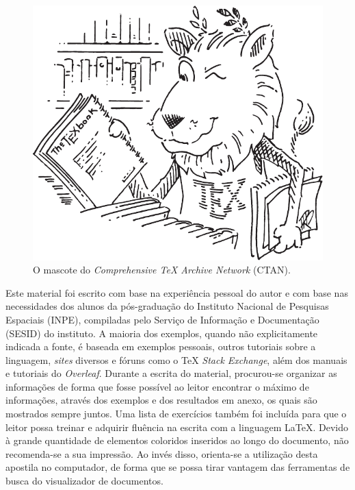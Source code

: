\begin{figure}[H]
\caption{O mascote do \textit{Comprehensive \TeX{} Archive Network} (CTAN).}
\vspace{6mm}
    \begin{center}
        \includegraphics[scale=0.8]{./docs/figs/ctanlion.pdf}
    \end{center}
\vspace{4mm}
\label{fig:leao_ctan}
\end{figure}

Este material foi escrito com base na experiência pessoal do autor e com base nas necessidades dos alunos da pós-graduação do Instituto Nacional de Pesquisas Espaciais (INPE), compiladas pelo Serviço de Informação e Documentação (SESID) do instituto. A maioria dos exemplos, quando não explicitamente indicada a fonte, é baseada em exemplos pessoais, outros tutoriais sobre a linguagem, \textit{sites} diversos e fóruns como o \TeX{} \textit{Stack Exchange}, além dos manuais e tutoriais do \textit{Overleaf}. Durante a escrita do material, procurou-se organizar as informações de forma que fosse possível ao leitor encontrar o máximo de informações, através dos exemplos e dos resultados em anexo, os quais são mostrados sempre juntos. Uma lista de exercícios também foi incluída para que o leitor possa treinar e adquirir fluência na escrita com a linguagem \LaTeX{}. Devido à grande quantidade de elementos coloridos inseridos ao longo do documento, não recomenda-se a sua impressão. Ao invés disso, orienta-se a utilização desta apostila no computador, de forma que se possa tirar vantagem das ferramentas de busca do visualizador de documentos.

